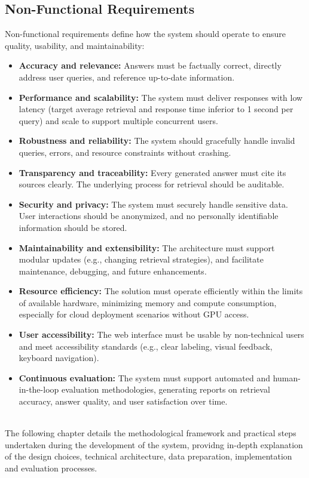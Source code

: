 \begin{spacing}{1.5}
\subsection{Non-Functional Requirements}
Non-functional requirements define how the system should operate to ensure quality, usability, and maintainability:
\begin{itemize}
    \item \textbf{Accuracy and relevance:} Answers must be factually correct, directly address user queries, and reference up-to-date information.
    \item \textbf{Performance and scalability:} The system must deliver responses with low latency (target average retrieval and response time inferior to 1 second per query) and scale to support multiple concurrent users.
    \item \textbf{Robustness and reliability:} The system should gracefully handle invalid queries, errors, and resource constraints without crashing.
    \item \textbf{Transparency and traceability:} Every generated answer must cite its sources clearly. The underlying process for retrieval should be auditable.
    \item \textbf{Security and privacy:} The system must securely handle sensitive data. User interactions should be anonymized, and no personally identifiable information should be stored.
    \item \textbf{Maintainability and extensibility:} The architecture must support modular updates (e.g., changing retrieval strategies), and facilitate maintenance, debugging, and future enhancements.
    \item \textbf{Resource efficiency:} The solution must operate efficiently within the limits of available hardware, minimizing memory and compute consumption, especially for cloud deployment scenarios without GPU access.
    \item \textbf{User accessibility:} The web interface must be usable by non-technical users and meet accessibility standards (e.g., clear labeling, visual feedback, keyboard navigation).
    \item \textbf{Continuous evaluation:} The system must support automated and human-in-the-loop evaluation methodologies, generating reports on retrieval accuracy, answer quality, and user satisfaction over time.
\end{itemize}

\citep{abu_shawar_chatbots_2007,arslan_survey_2024,gupta_comprehensive_2024}\\


The following chapter details the methodological framework and practical steps undertaken during the development of the system, providng in-depth explanation of the design choices, technical architecture, data preparation, implementation and evaluation processes.


\end{spacing}